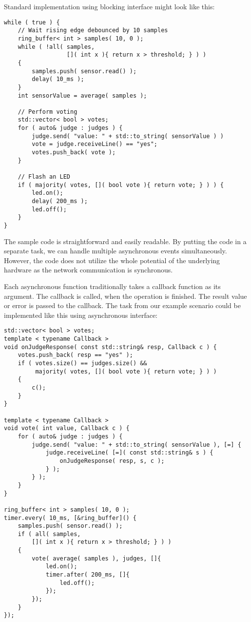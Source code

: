 Standard implementation using blocking interface might look like this:
\begin{verbatim}
while ( true ) {
    // Wait rising edge debounced by 10 samples
    ring_buffer< int > samples( 10, 0 );
    while ( !all( samples,
                  []( int x ){ return x > threshold; } ) )
    {
        samples.push( sensor.read() );
        delay( 10_ms );
    }
    int sensorValue = average( samples );

    // Perform voting
    std::vector< bool > votes;
    for ( auto& judge : judges ) {
        judge.send( "value: " + std::to_string( sensorValue ) )
        vote = judge.receiveLine() == "yes";
        votes.push_back( vote );
    }

    // Flash an LED
    if ( majority( votes, []( bool vote ){ return vote; } ) ) {
        led.on();
        delay( 200_ms );
        led.off();
    }
}
\end{verbatim}

The sample code is straightforward and easily readable. By putting the code in a
separate task, we can handle multiple asynchronous events simultaneously.
However, the code does not utilize the whole potential of the underlying
hardware as the network communication is synchronous.

Each asynchronous function traditionally takes a callback function as its
argument. The callback is called, when the operation is finished. The result
value or error is passed to the callback. The task from our example scenario
could be implemented like this using asynchronous interface:

\begin{verbatim}
std::vector< bool > votes;
template < typename Callback >
void onJudgeResponse( const std::string& resp, Callback c ) {
    votes.push_back( resp == "yes" );
    if ( votes.size() == judges.size() &&
         majority( votes, []( bool vote ){ return vote; } ) )
    {
        c();
    }
}

template < typename Callback >
void vote( int value, Callback c ) {
    for ( auto& judge : judges ) {
        judge.send( "value: " + std::to_string( sensorValue ), [=] {
            judge.receiveLine( [=]( const std::string& s ) {
                onJudgeResponse( resp, s, c );
            } );
        } );
    }
}

ring_buffer< int > samples( 10, 0 );
timer.every( 10_ms, [&ring_buffer]() {
    samples.push( sensor.read() );
    if ( all( samples,
        []( int x ){ return x > threshold; } ) )
    {
        vote( average( samples ), judges, []{
            led.on();
            timer.after( 200_ms, []{
                led.off();
            });
        });
    }
});
\end{verbatim}


